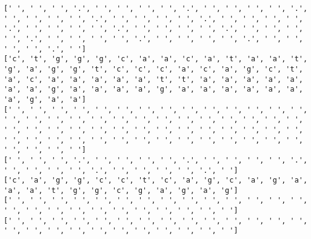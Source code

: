 \documentclass{article}
\begin{document}
\begin{Verbatim}
[' ', ' ', ' ', '.', ' ', ' ', ' ', ' ', '.', ' ', ' ', ' ', ' ', '.', ' ', ' ', ' ', ' ', '.', ' ', ' ', ' ', ' ', '.', ' ', ' ', ' ', ' ', '.', ' ', ' ', ' ', ' ', '.', ' ', ' ', ' ', ' ', '.', ' ', ' ', ' ', ' ', '.', ' ', ' ', ' ', ' ', '.', ' ', ' ', ' ', ' ', '.', ' ', ' ', ' ', ' ', '.', ' ']
['c', 't', 'g', 'g', 'g', 'c', 'a', 'a', 'c', 'a', 't', 'a', 'a', 't', 'g', 'a', 'g', 'g', 't', 'c', 'c', 'c', 'a', 'c', 'a', 'g', 'c', 't', 'a', 'c', 'a', 'a', 'a', 'a', 'a', 't', 't', 'a', 'a', 'a', 'a', 'a', 'a', 'a', 'g', 'a', 'a', 'a', 'a', 'g', 'a', 'a', 'a', 'a', 'a', 'a', 'a', 'g', 'a', 'a']
[' ', ' ', ' ', ' ', ' ', ' ', ' ', ' ', ' ', ' ', ' ', ' ', ' ', ' ', ' ', ' ', ' ', ' ', ' ', ' ', ' ', ' ', ' ', ' ', ' ', ' ', ' ', ' ', ' ', ' ', ' ', ' ', ' ', ' ', ' ', ' ', ' ', ' ', ' ', ' ', ' ', ' ', ' ', ' ', ' ', ' ', ' ', ' ', ' ', ' ', ' ', ' ', ' ', ' ', ' ', ' ', ' ', ' ', ' ', ' ']
[' ', ' ', ' ', '.', ' ', ' ', ' ', ' ', '.', ' ', ' ', ' ', ' ', '.', ' ', ' ', ' ', ' ', '.', ' ', ' ', ' ', ' ', '.', ' ']
['c', 'a', 'g', 'g', 'c', 'c', 't', 'c', 'a', 'g', 'c', 'a', 'g', 'a', 'a', 'a', 't', 'g', 'g', 'c', 'g', 'a', 'g', 'a', 'g']
[' ', ' ', ' ', ' ', ' ', ' ', ' ', ' ', ' ', ' ', ' ', ' ', ' ', ' ', ' ', ' ', ' ', ' ', ' ', ' ', ' ', ' ', ' ', ' ', ' ']
[' ', ' ', ' ', ' ', ' ', ' ', ' ', ' ', ' ', ' ', ' ', ' ', ' ', ' ', ' ', ' ', ' ', ' ', ' ', ' ', ' ', ' ', ' ', ' ', ' ']
 

\end{Verbatim}
\end{document}
